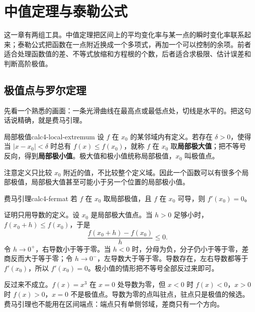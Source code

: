 \section{中值定理与泰勒公式}

这一章有两组工具。中值定理把区间上的平均变化率与某一点的瞬时变化率联系起来；泰勒公式把函数在一点附近换成一个多项式，再加一个可以控制的余项。前者适合处理函数值的差、不等式放缩和方程根的个数，后者适合求极限、估计误差和判断高阶极值。

\subsection{极值点与罗尔定理}

先看一个熟悉的画面：一条光滑曲线在最高点或最低点处，切线是水平的。把这句话说精确，就是费马引理。

\begin{mydef}{局部极值}{calc4-local-extremum}
设 $f$ 在 $x_0$ 的某邻域内有定义。若存在 $\delta>0$，使得当 $|x-x_0|<\delta$ 时总有 $f(x)\le f(x_0)$，就称 $f$ 在 $x_0$ 取\textbf{局部极大值}；把不等号反向，得到\textbf{局部极小值}。极大值和极小值统称局部极值，$x_0$ 叫极值点。
\end{mydef}

注意定义只比较 $x_0$ 附近的值，不比较整个定义域。因此一个函数可以有很多个局部极值，局部极大值甚至可能小于另一个位置的局部极小值。

\begin{conclusion}{费马引理}{calc4-fermat}
若 $f$ 在 $x_0$ 取局部极值，且 $f$ 在 $x_0$ 可导，则 $f'(x_0)=0$。
\end{conclusion}

证明只用导数的定义。设 $x_0$ 是局部极大值点。当 $h>0$ 足够小时，$f(x_0+h)\le f(x_0)$，于是
\[
\frac{f(x_0+h)-f(x_0)}{h}\le 0.
\]
令 $h\to0^+$，右导数小于等于零。当 $h<0$ 时，分母为负，分子仍小于等于零，差商反而大于等于零；令 $h\to0^-$，左导数大于等于零。导数存在，左右导数都等于 $f'(x_0)$，所以 $f'(x_0)=0$。极小值的情形把不等号全部反过来即可。

反过来不成立。$f(x)=x^3$ 在 $x=0$ 处导数为零，但 $x<0$ 时 $f(x)<0$，$x>0$ 时 $f(x)>0$，$x=0$ 不是极值点。导数为零的点叫驻点，驻点只是极值的候选。费马引理也不能用在区间端点：端点只有单侧邻域，差商只有一个方向。

